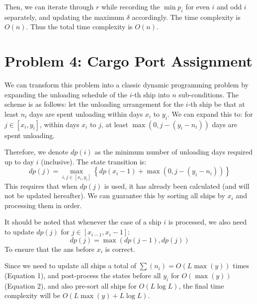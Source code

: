 \documentclass[11pt, a4paper, oneside]{memoir}
\begin{document}
Then, we can iterate through $r$ while recording the $\min p_i$ for even $i$ and odd $i$ separately, and updating the maximum $\delta$ accordingly.
The time complexity is $O(n)$. Thus the total time complexity is $O(n)$.

\chapter{Problem 4: Cargo Port Assignment}
We can transform this problem into a classic dynamic programming problem by expanding the unloading schedule of the $i$-th ship into $n$ sub-conditions.
The scheme is as follows: let the unloading arrangement for the $i$-th ship be that at least $n_i$ days are spent unloading within days $x_i$ to $y_i$.
We can expand this to: for $j \in [x_i, y_i]$, within days $x_i$ to $j$, at least $\max \left(0, j-(y_i-n_i)\right)$ days are spent unloading.

Therefore, we denote $dp(i)$ as the minimum number of unloading days required up to day $i$ (inclusive).
The state transition is:
\[ dp(j) = \max_{i, j \in [x_i, y_i]} \left\{ dp(x_i-1) + \max \left(0, j-(y_i-n_i)\right) \right\} \]
This requires that when $dp(j)$ is used, it has already been calculated (and will not be updated hereafter).
We can guarantee this by sorting all ships by $x_i$ and processing them in order.

It should be noted that whenever the case of a ship $i$ is processed, we also need to update $dp(j)$ for $j \in [x_{i-1}, x_i-1]$:
\[ dp(j) = \max \left( dp(j-1), dp(j) \right) \]
To ensure that the ans before $x_{i}$ is correct.

Since we need to update all ships a total of $\sum(n_i) = O(L\max(y))$ times (Equation 1), and post-process the states before all $y_i$ for $O(\max(y))$ (Equation 2),
and also pre-sort all ships for $O(L\log L)$, the final time complexity will be $O(L\max(y) + L\log L)$.

\label{LastPage}
\end{document}
